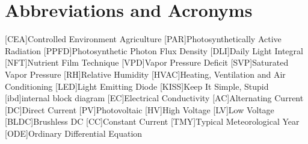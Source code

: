 \chapter{Abbreviations and Acronyms}
%
%
\begin{acronym}%
	[CEA]{Controlled Environment Agriculture}
	[PAR]{Photosynthetically Active Radiation}
	[PPFD]{Photosynthetic Photon Flux Density}
	[DLI]{Daily Light Integral}
	[NFT]{Nutrient Film Technique}
	[VPD]{Vapor Pressure Deficit}
	[SVP]{Saturated Vapor Pressure}
	[RH]{Relative Humidity}
	[HVAC]{Heating, Ventilation and Air Conditioning}
	[LED]{Light Emitting Diode}
	[KISS]{Keep It Simple, Stupid}
	[ibd]{internal block diagram}
	[EC]{Electrical Conductivity}
	[AC]{Alternating Current}
	[DC]{Direct Current}
	[PV]{Photovoltaic}
	[HV]{High Voltage}
	[LV]{Low Voltage}
	[BLDC]{Brushless DC}
	[CC]{Constant Current}
	[TMY]{Typical Meteorological Year}
	[ODE]{Ordinary Differential Equation}
\end{acronym}
